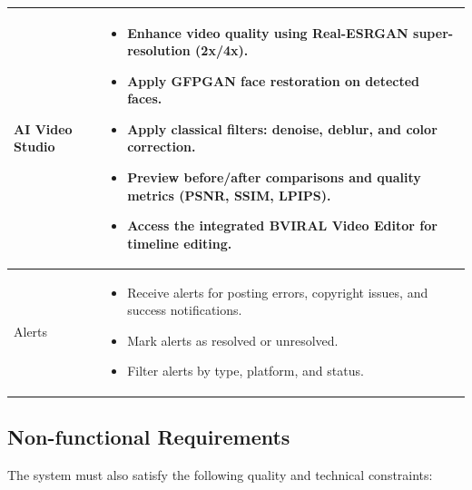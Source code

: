 \begin{longtable}{|p{4cm}|p{10cm}|}
AI Video Studio &
\begin{itemize}
    \item Enhance video quality using Real-ESRGAN super-resolution (2x/4x).
    \item Apply GFPGAN face restoration on detected faces.
    \item Apply classical filters: denoise, deblur, and color correction.
    \item Preview before/after comparisons and quality metrics (PSNR, SSIM, LPIPS).
    \item Access the integrated BVIRAL Video Editor for timeline editing.
\end{itemize} \\
\hline

Alerts &
\begin{itemize}
    \item Receive alerts for posting errors, copyright issues, and success notifications.
    \item Mark alerts as resolved or unresolved.
    \item Filter alerts by type, platform, and status.
\end{itemize} \\
\hline
\end{longtable}

\subsection{Non-functional Requirements}
The system must also satisfy the following quality and technical constraints:


